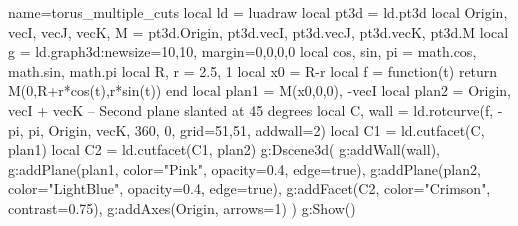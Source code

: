 \documentclass[12pt]{standalone}
\begin{document}
\begin{luadraw}{name=torus_multiple_cuts}
local ld = luadraw
local pt3d = ld.pt3d
local Origin, vecI, vecJ, vecK, M = pt3d.Origin, pt3d.vecI, pt3d.vecJ, pt3d.vecK, pt3d.M
local g = ld.graph3d:new{size={10,10}, margin={0,0,0,0}}
local cos, sin, pi = math.cos, math.sin, math.pi
local R, r = 2.5, 1
local x0 = R-r
local f = function(t) return M(0,R+r*cos(t),r*sin(t)) end
local plan1 = {M(x0,0,0), -vecI} 
local plan2 = {Origin, vecI + vecK} -- Second plane slanted at 45 degrees
local C, wall = ld.rotcurve(f, -pi, pi, {Origin, vecK}, 360, 0, {grid={51,51}, addwall=2})
local C1 = ld.cutfacet(C, plan1)   
local C2 = ld.cutfacet(C1, plan2)  
g:Dscene3d(
    g:addWall(wall),
    g:addPlane(plan1, {color="Pink", opacity=0.4, edge=true}), 
    g:addPlane(plan2, {color="LightBlue", opacity=0.4, edge=true}), 
    g:addFacet(C2, {color="Crimson", contrast=0.75}),
    g:addAxes(Origin, {arrows=1})
)
g:Show()
\end{luadraw}
\end{document}
